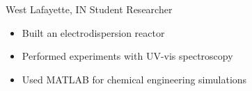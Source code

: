 
        {West Lafayette, IN}
        {Student Researcher}
        {}{
    \begin{itemize}
        \item Built an electrodispersion reactor
        \item Performed experiments with UV-vis spectroscopy
        \item Used MATLAB for chemical engineering simulations
    \end{itemize}
}
